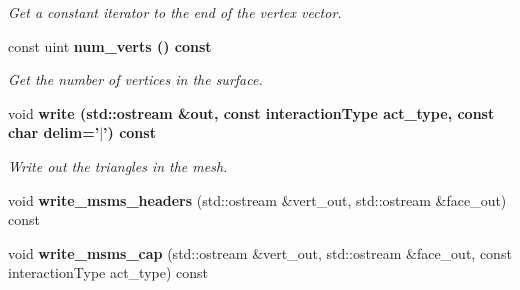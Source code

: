 \begin{CompactItemize}
\begin{CompactList}\small\item\em Get a constant iterator to the end of the vertex vector. \item\end{CompactList}\item 
const uint \bf{num\_\-verts} () const \label{classSimSite3D_1_1geometry_1_1TriMeshSphere_8835cfe88ab71442635ab7d5f05c4767}

\begin{CompactList}\small\item\em Get the number of vertices in the surface. \item\end{CompactList}\item 
void \bf{write} (std::ostream \&out, const interaction\-Type act\_\-type, const char delim='$|$') const \label{classSimSite3D_1_1geometry_1_1TriMeshSphere_dd30e7e90a9f41be6d54de06cba3d0f0}

\begin{CompactList}\small\item\em Write out the triangles in the mesh. \item\end{CompactList}\item 
void \textbf{write\_\-msms\_\-headers} (std::ostream \&vert\_\-out, std::ostream \&face\_\-out) const \label{classSimSite3D_1_1geometry_1_1TriMeshSphere_b3552eec82a823e41ef9ed70504b7368}

\item 
void \textbf{write\_\-msms\_\-cap} (std::ostream \&vert\_\-out, std::ostream \&face\_\-out, const interaction\-Type act\_\-type) const \label{classSimSite3D_1_1geometry_1_1TriMeshSphere_3772f4f815c191e7fe24cca03e8f96e9}

\end{CompactItemize}
